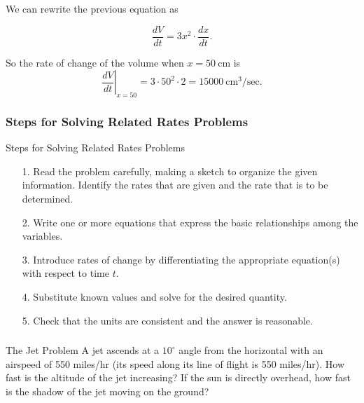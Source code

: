 \documentclass[cal1spr16Lectures.tex]{subfiles}
\begin{document}
\begin{frame}

We can rewrite the previous equation as

\[\frac{dV}{dt}=3x^2 \cdot \frac{dx}{dt}.\]

\vspace{1pc}
So the rate of change of the volume when $x=50\ \text{cm}$ is 
\[\left.\frac{dV}{dt}\right|_{x=50}=3\cdot 50^2 \cdot 2 = 15000\ \text{cm}^3/\text{sec}.\]
\end{frame}

\subsubsection{Steps for Solving Related Rates Problems}

\begin{frame}{\small Steps for Solving Related Rates Problems}
\small
\begin{itemize}
\item[1.] Read the problem carefully, making a sketch to organize the given information.  Identify the rates that are given and the rate that is to be determined.
\item[2.] Write one or more equations that express the basic relationships among the variables.
\item[3.] Introduce rates of change by differentiating the appropriate equation(s) with respect to time $t$.
\item[4.] Substitute known values and solve for the desired quantity.
\item[5.] Check that the units are consistent and the answer is reasonable.
\end{itemize}
\end{frame}

\begin{frame}
\frametitle{}
\begin{block}{The Jet Problem}
A jet ascends at a $10^{\circ}$ angle from the horizontal with an airspeed of 550 miles/hr (its speed along its line of flight is 550 miles/hr).  How fast is the altitude of the jet increasing?  If the sun is directly overhead, how fast is the shadow of the jet moving on the ground?
\end{block}
\end{frame}
\end{document}
